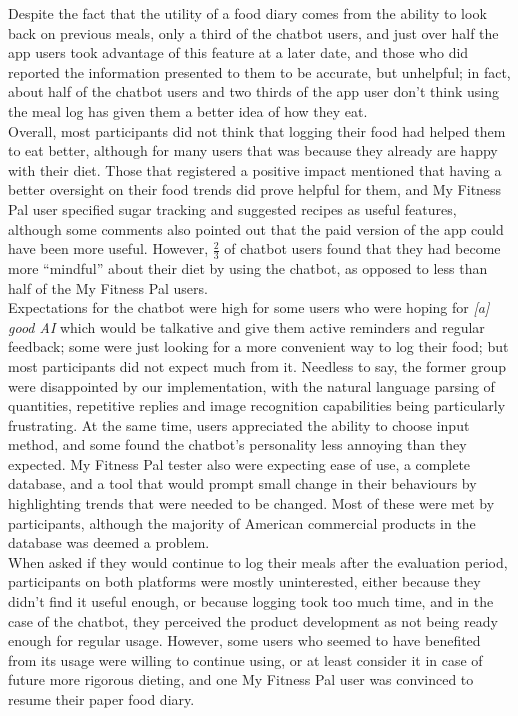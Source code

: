 Despite the fact that the utility of a food diary comes from the ability to look back on previous meals, only a third of the chatbot users, and just over half the app users took advantage of this feature at a later date, and those who did reported the information presented to them to be accurate, but unhelpful; in fact, about half of the chatbot users and two thirds of the app user don't think using the meal log has given them a better idea of how they eat. \\
Overall, most participants did not think that logging their food had helped them to eat better, although for many users that was because they already are happy with their diet. Those that registered a positive impact mentioned that having a better oversight on their food trends did prove helpful for them, and My Fitness Pal user specified sugar tracking and suggested recipes as useful features, although some comments also pointed out that the paid version of the app could have been more useful. However, $\frac{2}{3}$ of chatbot users found that they had become more ``mindful'' about their diet by using the chatbot, as opposed to less than half of the My Fitness Pal users. \\
Expectations for the chatbot were high for some users who were hoping for \textit{[a] good AI} which would be talkative and give them active reminders and regular feedback; some were just looking for a more convenient way to log their food; but most participants did not expect much from it. Needless to say, the former group were disappointed by our implementation, with the natural language parsing of quantities, repetitive replies and image recognition capabilities being particularly frustrating. At the same time, users appreciated the ability to choose input method, and some found the chatbot's personality less annoying than they expected. My Fitness Pal tester also were expecting ease of use, a complete database, and a tool that would prompt small change in their behaviours by highlighting trends that were needed to be changed. Most of these were met by participants, although the majority of American commercial products in the database was deemed a problem. \\
When asked if they would continue to log their meals after the evaluation period, participants on both platforms were mostly uninterested, either because they didn't find it useful enough, or because logging took too much time, and in the case of the chatbot, they perceived the product development as not being ready enough for regular usage. However, some users who seemed to have benefited from its usage were willing to continue using, or at least consider it in case of future more rigorous dieting, and one My Fitness Pal user was convinced to resume their paper food diary. \\
